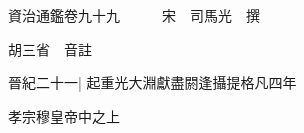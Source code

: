 






























































資治通鑑卷九十九　　　宋　司馬光　撰

胡三省　音註

晉紀二十一|{
	起重光大淵獻盡閼逢攝提格凡四年}


孝宗穆皇帝中之上

